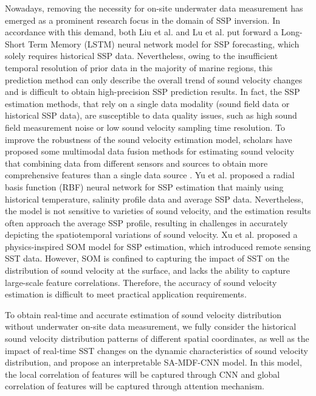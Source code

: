 Nowadays, removing the necessity for on-site underwater data measurement has emerged as a prominent research focus in the domain of SSP inversion. In accordance with this demand, both Liu et al. \cite{Liu2024SSPPrediction} and Lu et al. \cite{ Lu2024LSTM} put forward a Long-Short Term Memory (LSTM) neural network model for SSP forecasting, which solely requires historical SSP data. Nevertheless, owing to the insufficient temporal resolution of prior data in the majority of marine regions, this prediction method can only describe the overall trend of sound velocity changes and is difficult to obtain high-precision SSP prediction results. In fact, the SSP estimation methods, that rely on a single data modality (sound field data or historical SSP data), are susceptible to data quality issues, such as high sound field measurement noise or low sound velocity sampling time resolution. To improve the robustness of the sound velocity estimation model, scholars have proposed some multimodal data fusion methods for estimating sound velocity that combining data from different sensors and sources to obtain more comprehensive features than a single data source \cite{Yu2020RBF,Xu2025SOM}. Yu et al. \cite{Yu2020RBF} proposed a radial basis function (RBF) neural network for SSP estimation that mainly using historical temperature, salinity profile data and average SSP data. Nevertheless, the model is not sensitive to varieties of sound velocity, and the estimation results often approach the average SSP profile, resulting in challenges in accurately depicting the spatiotemporal variations of sound velocity. Xu et al. \cite{Xu2025SOM} proposed a physics-inspired SOM model for SSP estimation, which introduced remote sensing SST data. However, SOM is confined to capturing the impact of SST on the distribution of sound velocity at the surface, and lacks the ability to capture large-scale feature correlations. Therefore, the accuracy of sound velocity estimation is difficult to meet practical application requirements.

To obtain real-time and accurate estimation of sound velocity distribution without underwater on-site data measurement, we fully consider the historical sound velocity distribution patterns of different spatial coordinates, as well as the impact of real-time SST changes on the dynamic characteristics of sound velocity distribution, and propose an interpretable SA-MDF-CNN model. In this model, the local correlation of features will be captured through CNN and global correlation of features will be captured through attention mechanism.